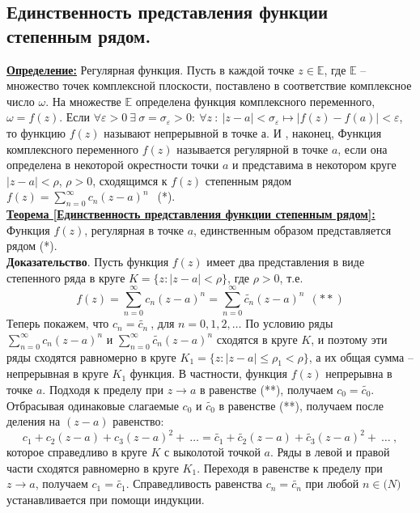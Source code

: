 \documentclass[a4paper,12pt]{article} %
\renewcommand {\epsilon}{\varepsilon}
\begin{document}
\subsection{Единственность представления функции степенным рядом.}
\underline{\textbf{Определение:}} Регулярная функция.
Пусть в каждой точке $z \in \mathbb{E}$, где $\mathbb{E}$ -- множество точек комплексной плоскости, поставлено в соответствие комплексное число $\omega$. На множестве $\mathbb{E}$ определена функция комплексного переменного, $\omega = f(z)$.
Если $\forall \epsilon > 0\ \exists \ \sigma = \sigma_{\epsilon} > 0:\ \forall z\ :\ |z - a| < \sigma_{\epsilon} \longmapsto |f(z) - f(a)| < \epsilon$, то функцию $f(z)$ называют непрерывной в точке а.
И , наконец, Функция комплексного переменного $f(z)$ называется регулярной в точке $a$, если она определена в некоторой окрестности точки $a$ и представима в некотором круге $|z - a| < \rho$, $\rho > 0$, сходящимся к $f(z)$ степенным рядом $f(z) = \sum\limits_{n = 0}^{\infty} c_n(z-a)^n\ \ $ (*).\\
\underline{\textbf{Теорема [Единственность представления функции степенным рядом]:}}
Функция $f(z)$, регулярная в точке $a$, единственным образом представляется рядом (*).\\
\textbf{Доказательство}. Пусть функция $f(z)$ имеет два представления в виде степенного ряда в круге $K = \{z: |z-a|<\rho\}$, где $\rho > 0$, т.е.
\begin{equation*}
f(z) = \sum\limits_{n = 0}^{\infty}c_n(z-a)^n = \sum\limits_{n = 0}^{\infty}\widetilde{c_n}(z-a)^n\ \ (**)
\end{equation*}
Теперь покажем, что $c_n = \widetilde{c_n} \ $, для $n = 0, 1, 2,\dots$
По условию ряды $\sum\limits_{n = 0}^{\infty}c_n(z-a)^n$ и $\sum\limits_{n = 0}^{\infty}\widetilde{c_n}(z-a)^n$ сходятся в круге $K$, и поэтому эти ряды сходятся равномерно в круге $K_1 = \{z: |z - a|\leqslant \rho_1 < \rho \}$, а их общая сумма -- непрерывная в круге $K_1$ функция. В частности, функция $f(z)$ непрерывна в точке $a$. Подходя к пределу при $z \to a$ в равенстве (**), получаем $c_0 = \widetilde{c_0}$. Отбрасывая одинаковые слагаемые $c_0$ и $\widetilde{c_0}$ в равенстве (**), получаем после деления на $(z - a)$ равенство:
\begin{equation*}
c_1 + c_2(z - a) + c_3(z - a)^2 +\ \dots = \widetilde{c_1} + \widetilde{c_2}(z - a) + \widetilde{c_3}(z - a)^2 +\ \dots\ ,
\end{equation*}
которое справедливо в круге $K$ с выколотой точкой $a$. Ряды в левой и правой части сходятся равномерно в круге $K_1$. Переходя в равенстве к пределу при $z \to a$, получаем $c_1 = \widetilde{c_1}$. Справедливость равенства $c_n = \widetilde{c_n}$ при любой $n \in \mathbb(N)$ устанавливается при помощи индукции.
\end{document}
